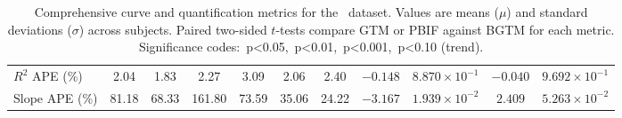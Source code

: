 \begin{sidewaystable}[b]
\begin{tabular}{l|cc|cc|cc|cc|cc}
		\(R^2\) APE (\%)                 & 2.04                               & 1.83                              & 2.27                               & 3.09                                      & 2.06                                      & 2.40       & \(-0.148\) & \(8.870\times10^{-1}\)         & \(-0.040\) & \(9.692\times10^{-1}\) \\
		Slope APE (\%)                   & 81.18                              & 68.33                             & 161.80                             & 73.59                                     & 35.06                                     & 24.22      & \(-3.167\) & \(1.939\times10^{-2}\)\sym{*}  & \(2.409\)  & \(5.263\times10^{-2}\) \\
		\bottomrule
	\end{tabular}
	\caption{Comprehensive curve and quantification metrics for the \yohimbine\ dataset.
		Values are means (\(\mu\)) and standard deviations (\(\sigma\)) across subjects.
		Paired two-sided \(t\)-tests compare GTM or PBIF against BGTM for each metric.
		Significance codes: \sym{*}\,p<0.05, \sym{**}\,p<0.01, \sym{***}\,p<0.001, \sym{\dag}\,p<0.10 (trend).}
	\label{tab:metrics_all_yoh}
\end{sidewaystable}
